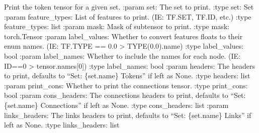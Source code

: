 \documentclass[letterpaper,10pt,english]{sphinxmanual}
\begin{document}
\begin{fulllineitems}
\begin{fulllineitems}
\label{\detokenize{nodes:nodes.nodePrinter.nodePrinter.print_token_tensor}}
\pysigstartsignatures
\pysiglinewithargsret
{}
{\sphinxparamcomma {}\sphinxparamcomma {}\sphinxparamcomma {}\sphinxparamcomma {}\sphinxparamcomma {}\sphinxparamcomma {}\sphinxparamcomma {}\sphinxparamcomma {}}
{}
\pysigstopsignatures
\sphinxAtStartPar
Print the token tensor for a given set.
:param set: The set to print.
:type set: Set
:param feature\_types: List of features to print. (IE: TF.SET, TF.ID, etc.)
:type feature\_types: list
:param mask: Mask of subtensor to print.
:type mask: torch.Tensor
:param label\_values: Whether to convert features floats to their enum names. (IE: TF.TYPE == 0.0 \sphinxhyphen{}\textgreater{} TYPE(0.0).name)
:type label\_values: bool
:param label\_names: Whether to include the names for each node. (IE: ID==0 \sphinxhyphen{}\textgreater{} tensor.names{[}0{]})
:type label\_names: bool
:param headers: The headers to print, defaults to “Set: \{set.name\} Tokens” if left as None.
:type headers: list
:param print\_cons: Whether to print the connections tensor.
:type print\_cons: bool
:param cons\_headers: The connections headers to print, defaults to “Set: \{set.name\} Connections” if left as None.
:type cons\_headers: list
:param links\_headers: The links headers to print, defaults to “Set: \{set.name\} Links” if left as None.
:type links\_headers: list

\end{fulllineitems}



\end{fulllineitems}
\end{document}
